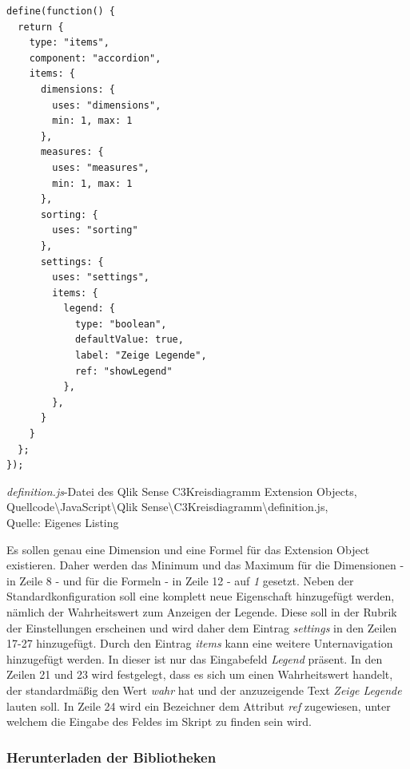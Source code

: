 \ifIncludeFigures\begin{listing}[htbp]
\begin{verbatim}
define(function() {
  return {
    type: "items",
    component: "accordion",
    items: {
      dimensions: {
        uses: "dimensions",
        min: 1, max: 1
      },
      measures: {
        uses: "measures",
        min: 1, max: 1
      },
      sorting: {
        uses: "sorting"
      },
      settings: {
        uses: "settings",
        items: {
          legend: {
            type: "boolean",
            defaultValue: true,
            label: "Zeige Legende",
            ref: "showLegend"            
          },
        },
      }
    }
  };
});
\end{verbatim}
\caption[\textit{definition.js}-Datei des Qlik Sense C3Kreisdiagramm Extension Objects]{\textit{definition.js}-Datei des Qlik Sense C3Kreisdiagramm Extension Objects, \\Quellcode\textbackslash{}JavaScript\textbackslash{}Qlik Sense\textbackslash{}C3Kreisdiagramm\textbackslash{}definition.js, \\Quelle: Eigenes Listing}
\label{lst:QlikSenseC3KreisdiagrammDefinitionJs}
\end{listing}\fi

Es sollen genau eine Dimension und eine Formel für das Extension Object existieren. Daher werden das Minimum und das Maximum für die Dimensionen - in Zeile 8 - und für die Formeln - in Zeile 12 - auf \textit{1} gesetzt. Neben der Standardkonfiguration soll eine komplett neue Eigenschaft hinzugefügt werden, nämlich der Wahrheits\-wert zum Anzeigen der Legende. Diese soll in der Rubrik der Einstellungen erscheinen und wird daher dem Eintrag \textit{settings} in den Zeilen 17-27 hinzugefügt. Durch den Eintrag \textit{items} kann eine weitere Unternavigation hinzugefügt werden. In dieser ist nur das Eingabefeld \textit{Legend} präsent. In den Zeilen 21 und 23 wird festgelegt, dass es sich um einen Wahrheits\-wert handelt, der standardmäßig den Wert \textit{wahr} hat und der anzuzeigende Text \textit{Zeige Legende} lauten soll. In Zeile 24 wird ein Bezeichner dem Attribut \textit{ref} zugewiesen, unter welchem die Eingabe des Feldes im Skript zu finden sein wird.



\subsubsection{Herunterladen der Bibliotheken}
\label{lab:HerunterladenDerBibliothekenQlikSense} 

